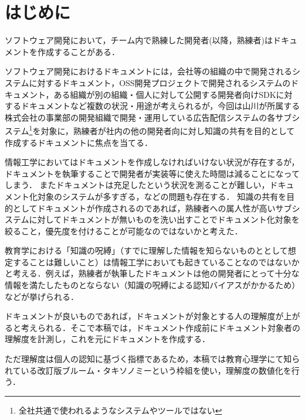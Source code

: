 \section{はじめに}
ソフトウェア開発において，チーム内で熟練した開発者(以降，熟練者)はドキュメントを作成することがある．\cite{bib:ozawa}

ソフトウェア開発におけるドキュメントには，会社等の組織の中で開発されるシステムに対するドキュメント，OSS開発プロジェクトで開発されるシステムのドキュメント，ある組織が別の組織・個人に対して公開する開発者向けSDKに対するドキュメントなど複数の状況・用途が考えられるが，今回は山川が所属する株式会社の事業部の開発組織で開発・運用している広告配信システムの各サブシステム\footnote{全社共通で使われるようなシステムやツールではない}を対象に，熟練者が社内の他の開発者向に対し知識の共有を目的として作成するドキュメントに焦点を当てる．

情報工学においてはドキュメントを作成しなければいけない状況が存在するが，ドキュメントを執筆することで開発者が実装等に使えた時間は減ることになってしまう．
またドキュメントは充足したという状況を測ることが難しい，ドキュメント化対象のシステムが多すぎる，などの問題も存在する．
知識の共有を目的としてドキュメントが作成されるのであれば，熟練者への属人性が高いサブシステムに対してドキュメントが無いものを洗い出すことでドキュメント化対象を絞ること，優先度を付けることが可能なのではないかと考えた．

教育学における「知識の呪縛」（すでに理解した情報を知らないものととして想定することは難しいこと）\cite{bib:kaneda}は情報工学においても起きていることなのではないかと考える．例えば，熟練者が執筆したドキュメントは他の開発者にとって十分な情報を満たしたものとならない（知識の呪縛による認知バイアスがかかるため）などが挙げられる．

ドキュメントが良いものであれば，ドキュメントが対象とする人の理解度が上がると考えられる．そこで本稿では，ドキュメント作成前にドキュメント対象者の理解度を計測し，これを元にドキュメントを作成する．

ただ理解度は個人の認知に基づく指標であるため，本稿では教育心理学にて知られている改訂版ブルーム・タキソノミー\cite{bib:nakao}という枠組を使い，理解度の数値化を行う．

